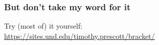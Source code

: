 \documentclass{beamer}
\begin{document}
\begin{frame}
\frametitle{But don't take my word for it}
Try (most of) it yourself:\\
\url{https://sites.und.edu/timothy.prescott/bracket/}
\begin{center}
\end{center}
\end{frame}
\end{document}
